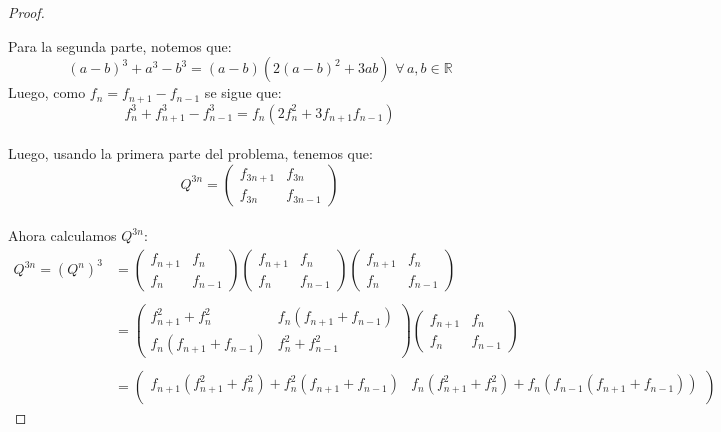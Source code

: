 \documentclass[11pt,letterpaper]{article}
\newcommand{\R}{\mathbb{R}}
\begin{document}
\begin{proof}
\begin{itemize}
    \end{itemize}
    Para la segunda parte, notemos que:
    \begin{equation*}
        (a-b)^3+a^3-b^3=(a-b)(2(a-b)^2+3ab)\,\,\forall\,a,b\in \R
    \end{equation*}
    Luego, como $f_n=f_{n+1}-f_{n-1}$ se sigue que:\,\\
    \begin{equation*}
        f^3_n+f^3_{n+1}-f^3_{n-1}=f_n(2f_n^2+3f_{n+1}f_{n-1})
    \end{equation*}\,\\
    Luego, usando la primera parte del problema, tenemos que:\,\\
    \begin{equation*}
        Q^{3n}=\begin{pmatrix}
            f_{3n+1}&f_{3n}\\
            f_{3n}&f_{3n-1}
        \end{pmatrix}
    \end{equation*}\,\\
    Ahora calculamos $Q^{3n}$:
    \begin{align*}
        Q^{3n}=(Q^n)^3&=\begin{pmatrix}
            f_{n+1}&f_n\\
            f_n&f_{n-1}
        \end{pmatrix}\begin{pmatrix}
            f_{n+1}&f_n\\
            f_n&f_{n-1}
        \end{pmatrix}\begin{pmatrix}
            f_{n+1}&f_n\\
            f_n&f_{n-1}
        \end{pmatrix}\,\\
        \,\\
        &=\begin{pmatrix}
            f_{n+1}^2+f_n^2&f_n(f_{n+1}+f_{n-1})\\
            f_n(f_{n+1}+f_{n-1})&f_n^2+f_{n-1}^2
        \end{pmatrix}
        \begin{pmatrix}
            f_{n+1}&f_n\\
            f_n&f_{n-1}
        \end{pmatrix}\,\\
        \,\\
        &=\begin{pmatrix}
            f_{n+1}(f_{n+1}^2+f_n^2)+f_n^2(f_{n+1}+f_{n-1})&f_n(f_{n+1}^2+f_n^2)+f_n(f_{n-1}(f_{n+1}+f_{n-1}))\\

\end{pmatrix}
\end{align*}
\end{proof}
\end{document}
